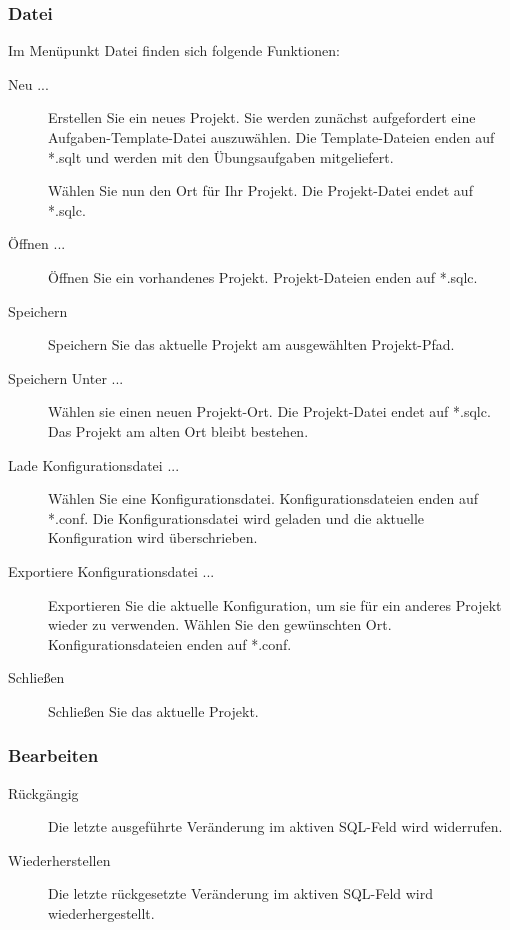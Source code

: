 \documentclass[11pt]{article}
\begin{document}
\subsubsection{Datei}
\label{subsubsec:Datei}
Im Menüpunkt Datei finden sich folgende Funktionen:
\begin{description}
	\item[\label{item:Neu}Neu ...] Erstellen Sie ein neues Projekt. Sie werden zunächst aufgefordert eine Aufgaben-Template-Datei auszuwählen. Die Template-Dateien enden auf *.sqlt und werden mit den Übungsaufgaben mitgeliefert.
	
	Wählen Sie nun den Ort für Ihr Projekt. Die Projekt-Datei endet auf *.sqlc.
	\item[\label{item:Oeffnen}Öffnen ...]
	Öffnen Sie ein vorhandenes Projekt. Projekt-Dateien enden auf *.sqlc.
	\item[\label{item:Speichern}Speichern] Speichern Sie das aktuelle Projekt am ausgewählten Projekt-Pfad.
	\item[\label{item:SpeichernUnter} Speichern Unter ...] Wählen sie einen neuen Projekt-Ort. Die Projekt-Datei endet auf *.sqlc. Das Projekt am alten Ort bleibt bestehen.
	\item[\label{item:LadeKonf}Lade Konfigurationsdatei ...]
	Wählen Sie eine Konfigurationsdatei. Konfigurationsdateien enden auf *.conf. Die Konfigurationsdatei wird geladen und die aktuelle Konfiguration wird überschrieben.
	\item[\label{item:ExportKonf}Exportiere Konfigurationsdatei ...]
	Exportieren Sie die aktuelle Konfiguration, um sie für ein anderes Projekt wieder zu verwenden. Wählen Sie den gewünschten Ort. Konfigurationsdateien enden auf *.conf.
	\item[\label{item:close}Schließen] Schließen Sie das aktuelle Projekt.
\end{description} 

\subsubsection{Bearbeiten}
\label{subsubsec:Bearbeiten}
\begin{description}
	\item[\label{item:undo} Rückgängig] Die letzte ausgeführte Veränderung im aktiven SQL-Feld wird widerrufen.
	\item[\label{item:redo} Wiederherstellen] Die letzte rückgesetzte Veränderung im aktiven SQL-Feld wird wiederhergestellt.
\end{description}
\end{document}
